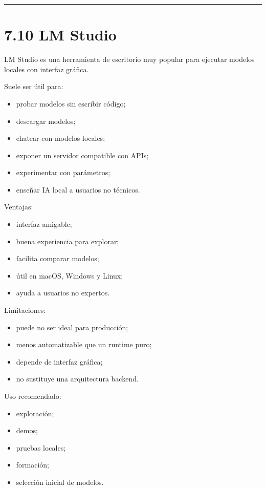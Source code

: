 \begin{center}\rule{0.5\linewidth}{0.5pt}\end{center}

\section{7.10 LM Studio}\label{lm-studio}

LM Studio es una herramienta de escritorio muy popular para ejecutar
modelos locales con interfaz gráfica.

Suele ser útil para:

\begin{itemize}
\tightlist
\item
  probar modelos sin escribir código;
\item
  descargar modelos;
\item
  chatear con modelos locales;
\item
  exponer un servidor compatible con APIs;
\item
  experimentar con parámetros;
\item
  enseñar IA local a usuarios no técnicos.
\end{itemize}

Ventajas:

\begin{itemize}
\tightlist
\item
  interfaz amigable;
\item
  buena experiencia para explorar;
\item
  facilita comparar modelos;
\item
  útil en macOS, Windows y Linux;
\item
  ayuda a usuarios no expertos.
\end{itemize}

Limitaciones:

\begin{itemize}
\tightlist
\item
  puede no ser ideal para producción;
\item
  menos automatizable que un runtime puro;
\item
  depende de interfaz gráfica;
\item
  no sustituye una arquitectura backend.
\end{itemize}

Uso recomendado:

\begin{itemize}
\tightlist
\item
  exploración;
\item
  demos;
\item
  pruebas locales;
\item
  formación;
\item
  selección inicial de modelos.
\end{itemize}

